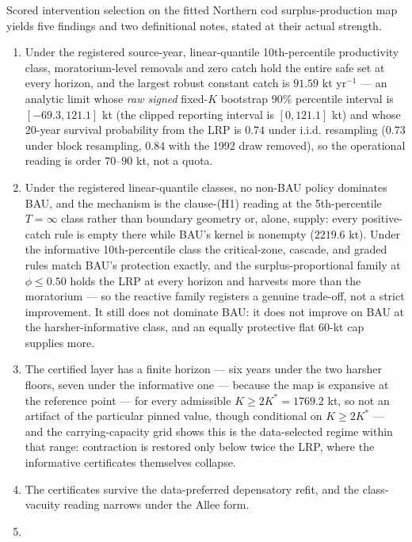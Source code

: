 \documentclass[11pt]{article}
\begin{document}
Scored intervention selection on the fitted Northern cod
surplus-production map yields five findings and two definitional notes,
stated at their actual strength.

\begin{enumerate}
\def\labelenumi{(\arabic{enumi})}
\item
  Under the registered source-year, linear-quantile 10th-percentile
  productivity class, moratorium-level removals and zero catch hold the entire safe set at
  every horizon, and the largest robust constant catch is \(91.59\) kt
  yr\(^{-1}\) --- an analytic limit whose \emph{raw signed} fixed-$K$
  bootstrap \(90\%\) percentile interval is \([-69.3,121.1]\) kt
  (the clipped reporting interval is \([0,121.1]\) kt) and whose 20-year survival probability from the LRP
  is \(0.74\) under i.i.d. resampling (\(0.73\) under block
  resampling, \(0.84\) with the 1992 draw removed), so the operational
  reading is order
  \(70\)--\(90\) kt, not a quota.
\item
  Under the registered linear-quantile classes, no non-BAU policy
  dominates BAU, and the mechanism is the clause-(H1)
  reading at the 5th-percentile \(T=\infty\) class rather than boundary
  geometry or, alone, supply: every positive-catch rule is empty there
  while BAU's kernel is nonempty (\(2219.6\) kt). Under the informative
  10th-percentile class the critical-zone, cascade, and graded rules
  match BAU's protection exactly, and the surplus-proportional family at
  \(\phi \le 0.50\) holds the LRP at every horizon and harvests more
  than the moratorium --- so the reactive family registers a genuine
  trade-off, not a strict improvement. It still does not dominate BAU:
  it does not improve on BAU at the harsher-informative class, and an
  equally protective flat 60-kt cap supplies more.
\item
  The certified layer has a finite horizon --- six years under the two
  harsher floors, seven under the informative one --- because the map
  is expansive at the reference point --- for every admissible
  \(K \ge 2K^* = 1769.2\) kt, so not an artifact of the particular
  pinned value, though conditional on \(K \ge 2K^*\) --- and the
  carrying-capacity grid shows this is the data-selected regime within
  that range: contraction is restored only below twice the LRP, where
  the informative certificates themselves collapse.
\item
  The certificates survive the data-preferred depensatory refit, and the
  class-vacuity reading narrows under the Allee form.
\item

\end{enumerate}
\end{document}

